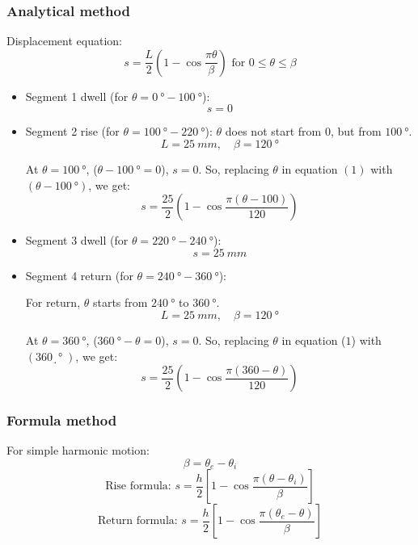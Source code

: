 \documentclass[11pt]{article}
\begin{document}
\subsubsection{Analytical method}
\label{sec:orgeae752e}
Displacement equation:
\[s = \frac{L}{2} \left(1 - \cos \frac{\pi \theta}{\beta} \right) \text{ for } 0 \le \theta \le \beta \tag{1}\]
\begin{itemize}
\item Segment 1 dwell (for \(\theta = \qty{0}{\degree} - \qty{100}{\degree}\)):
\[s = 0\]

\item Segment 2 rise (for \(\theta = \qty{100}{\degree} - \qty{220}{\degree}\)):
\(\theta\) does not start from 0, but from \(\qty{100}{\degree}\).
\[L = \qty{25}{mm}, \quad \beta = \qty{120}{\degree}\]

At \(\theta = \qty{100}{\degree}\), (\(\theta - \qty{100}{\degree} = 0\)), \(s = 0\). So, replacing \(\theta\) in equation \((1)\) with \((\theta - \qty{100}{\degree})\), we get:
\[s = \frac{25}{2} \left(1 - \cos \frac{\pi (\theta - 100)}{120} \right)\]

\item Segment 3 dwell (for \(\theta = \qty{220}{\degree} - \qty{240}{\degree}\)):
\[s = \qty{25}{mm}\]

\item Segment 4 return (for \(\theta = \qty{240}{\degree} - \qty{360}{\degree}\)):

For return, \(\theta\) starts from \(\qty{240}{\degree}\) to \(\qty{360}{\degree}\).
\[L = \qty{25}{mm}, \quad \beta = \qty{120}{\degree}\]

At \(\theta = \qty{360}{\degree}\), (\(\qty{360}{\degree} - \theta = 0\)), \(s = 0\). So, replacing \(\theta\) in equation (\(1\)) with \((\qty{360}{̣\degree})\), we get:
\[s = \frac{25}{2} \left(1 - \cos \frac{\pi (360 - \theta)}{120} \right)\]
\end{itemize}

 \newpage
\subsubsection{Formula method}
\label{sec:org6d70bbd}
For simple harmonic motion:
\[\beta = \theta_e - \theta_i\]
\[\text{Rise formula: } s = \frac{h}{2} \left[1 - \cos \frac{\pi (\theta - \theta_i)}{\beta} \right] \tag{1}\]
\[\text{Return formula: } s = \frac{h}{2} \left[1 - \cos \frac{\pi (\theta_e - \theta)}{\beta} \right] \tag{2}\]
\end{document}
